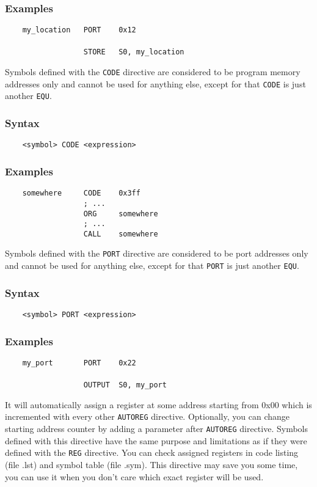     \subsubsection{Examples}
        \verb'    my_location   PORT    0x12'\\
        \verb''\\
        \verb'                  STORE   S0, my_location'

    Symbols defined with the \texttt{CODE} directive are considered to be program memory addresses only and cannot be used for anything else, except for that \texttt{CODE} is just another \texttt{EQU}.

    \subsubsection{Syntax}
        \verb'    <symbol> CODE <expression>'

    \subsubsection{Examples}
        \verb'    somewhere     CODE    0x3ff'\\
        \verb'                  ; ...'\\
        \verb'                  ORG     somewhere'\\
        \verb'                  ; ...'\\
        \verb'                  CALL    somewhere'

    Symbols defined with the \texttt{PORT} directive are considered to be port addresses only and cannot be used for anything else, except for that \texttt{PORT} is just another \texttt{EQU}.

    \subsubsection{Syntax}
        \verb'    <symbol> PORT <expression>'

    \subsubsection{Examples}
        \verb'    my_port       PORT    0x22'\\
        \verb''\\
        \verb'                  OUTPUT  S0, my_port'

\clearpage
{}
    It will automatically assign a register at some address starting from 0x00 which is incremented with every other \texttt{AUTOREG} directive. Optionally, you can change starting address counter by adding a parameter after \texttt{AUTOREG} directive. Symbols defined with this directive have the same purpose and limitations as if they were defined with the \texttt{REG} directive. You can check assigned registers in code listing (file .lst) and symbol table (file .sym). This directive may save you some time, you can use it when you don't care which exact register will be used.

